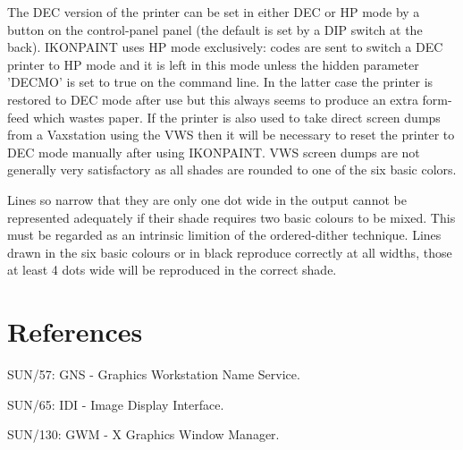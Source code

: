 The DEC version of the printer can be set in either DEC or HP mode by a
button on the control-panel panel (the default is set by a DIP switch at
the back). IKONPAINT uses HP mode exclusively: codes are sent to switch
a DEC printer to HP mode and it is left in this mode unless the hidden
parameter 'DECMO' is set to true on the command line. In the latter case
the printer is restored to DEC mode after use but this
always seems to produce an extra form-feed which wastes paper. If the
printer is also used to take direct screen dumps from a Vaxstation using
the VWS then it will be necessary to reset the printer to DEC mode
manually after using IKONPAINT.  VWS screen dumps are not generally very
satisfactory as all shades are rounded to one of the six basic colors.

Lines so narrow that they are only one dot wide in the output cannot be
represented adequately if their shade requires two basic colours to be
mixed. This must be regarded as an intrinsic limition of the
ordered-dither technique.  Lines drawn in the six basic colours or in
black reproduce correctly at all widths, those at least 4 dots wide will
be reproduced in the correct shade. 

\section{References} 

SUN/57: GNS - Graphics Workstation Name Service.

SUN/65: IDI - Image Display Interface.

SUN/130: GWM - X Graphics Window Manager.

 
